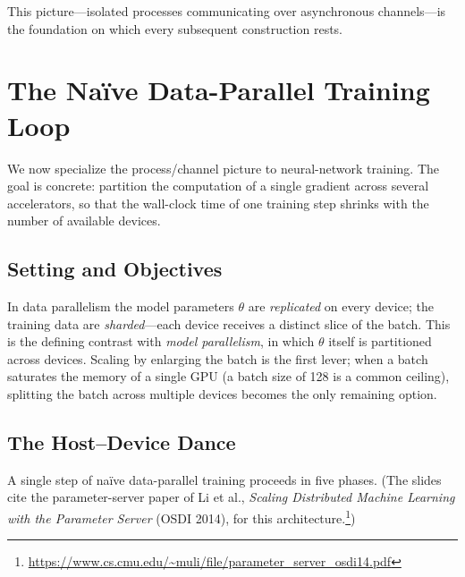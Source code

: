 \documentclass[11pt,a4paper]{article}
\theoremstyle{definition}
\theoremstyle{remark}
\theoremstyle{plain}
\begin{document}
This picture---isolated processes communicating over asynchronous
channels---is the foundation on which every subsequent construction
rests.

\section{The Na\"ive Data-Parallel Training Loop}

We now specialize the process/channel picture to neural-network training.
The goal is concrete: partition the computation of a single gradient
across several accelerators, so that the wall-clock time of one training
step shrinks with the number of available devices.

\subsection{Setting and Objectives}

In data parallelism the model parameters $\theta$ are \emph{replicated}
on every device; the training data are \emph{sharded}---each device
receives a distinct slice of the batch. This is the defining contrast
with \emph{model parallelism}, in which $\theta$ itself is partitioned
across devices. Scaling by enlarging the batch is the first lever; when a
batch saturates the memory of a single GPU (a batch size of 128 is a
common ceiling), splitting the batch across multiple devices becomes the
only remaining option.

\subsection{The Host--Device Dance}

A single step of na\"ive data-parallel training proceeds in five phases.
(The slides cite the parameter-server paper of Li et al., \emph{Scaling
Distributed Machine Learning with the Parameter Server} (OSDI 2014), for
this architecture.\footnote{\url{https://www.cs.cmu.edu/~muli/file/parameter_server_osdi14.pdf}})
\end{document}
